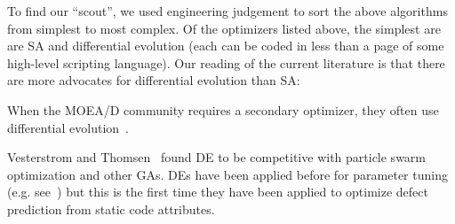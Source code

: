 To find our ``scout'',  we used engineering judgement to sort  the above algorithms from simplest to most complex.
Of the optimizers listed above, the simplest are are SA  and 
differential evolution (each can be coded in less than a page of some high-level scripting language). Our reading of the current literature is that there are more  advocates for
differential evolution than
  SA:
  \bi
  \item
  When the MOEA/D community requires a secondary optimizer, they often use  differential evolution~\cite{zhang07,5583335}.
  \item
 Vesterstrom and Thomsen~\cite{Vesterstrom04} found DE to be competitive with 
   particle swarm optimization and other GAs.
   \ei
DEs have been applied before for   parameter tuning (e.g. see~\cite{omran2005differential, chiha2012tuning}) but this is the first time they have been applied to
optimize defect prediction from static code attributes.  


 
 

 